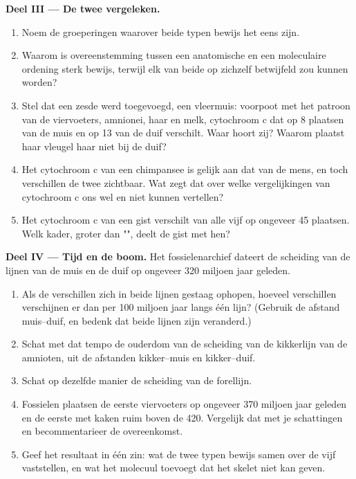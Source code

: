 \begin{problem}
\medskip
\noindent\textbf{Deel III --- De twee vergeleken.}
\begin{enumerate}[resume]
  \item Noem de groeperingen waarover beide typen bewijs het eens
        zijn.
  \item Waarom is overeenstemming tussen een anatomische en een
        moleculaire ordening sterk bewijs, terwijl elk van beide op
        zichzelf betwijfeld zou kunnen worden?
  \item Stel dat een zesde  werd toegevoegd, een vleermuis:
        voorpoot met het patroon van de viervoeters, amnionei, haar en
        melk, cytochroom c dat op 8 plaatsen van de muis en op 13 van de
        duif verschilt. Waar hoort zij? Waarom plaatst haar vleugel haar
        niet bij de duif?
  \item Het cytochroom c van een chimpansee is gelijk aan dat van de
        mens, en toch verschillen de twee  zichtbaar. Wat zegt
        dat over welke  vergelijkingen van cytochroom c ons wel en
        niet kunnen vertellen?
  \item Het cytochroom c van een gist verschilt van alle vijf op
        ongeveer 45 plaatsen. Welk kader, groter dan "",
        deelt de gist met hen?
\end{enumerate}

\medskip
\noindent\textbf{Deel IV --- Tijd en de boom.}
Het fossielenarchief dateert de scheiding van de lijnen van de muis en
de duif op ongeveer 320 miljoen jaar geleden.
\begin{enumerate}[resume]
  \item Als de verschillen zich in beide lijnen gestaag ophopen, hoeveel
        verschillen verschijnen er dan per 100 miljoen jaar langs één
        lijn? (Gebruik de afstand muis--duif, en bedenk dat beide lijnen
        zijn veranderd.)
  \item Schat met dat tempo de ouderdom van de scheiding van de
        kikkerlijn van de amnioten, uit de afstanden kikker--muis en
        kikker--duif.
  \item Schat op dezelfde manier de scheiding van de forellijn.
  \item Fossielen plaatsen de eerste viervoeters op ongeveer 370 miljoen
        jaar geleden en de eerste  met kaken ruim boven de
        420. Vergelijk dat met je schattingen en becommentarieer de
        overeenkomst.
  \item Geef het resultaat in één zin: wat de twee typen bewijs samen
        over de vijf  vaststellen, en wat het molecuul toevoegt
        dat het skelet niet kan geven.
\end{enumerate}
\end{problem}
